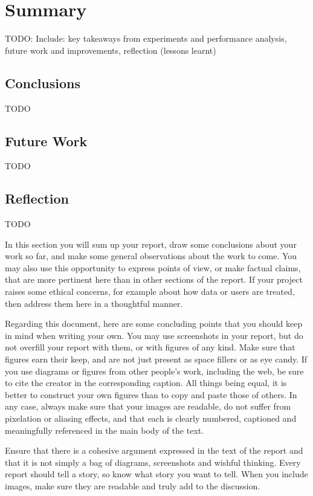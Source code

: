 \chapter{Summary}

TODO: Include: key takeaways from experiments and performance analysis, future work and improvements, reflection (lessons learnt)

\section{Conclusions}

TODO

\section{Future Work}

TODO

\section{Reflection}

TODO

In this section you will sum up your report, draw some conclusions about your work so far, and make some
general observations about the work to come. You may also use this opportunity to express points of view,
or make factual claims, that are more pertinent here than in other sections of the report. If your project
raises some ethical concerns, for example about how data or users are treated, then address them here in a
thoughtful manner.

Regarding this document, here are some concluding points that you should keep in mind when writing your own.
You may use screenshots in your report, but do not overfill your report with them, or with figures of any kind.
Make sure that figures earn their keep, and are not just present as space fillers or as eye candy. If you use
diagrams or figures from other people’s work, including the web, be sure to cite the creator in the corresponding
caption. All things being equal, it is better to construct your own figures than to copy and paste those of others.
In any case, always make sure that your images are readable, do not suffer from pixelation or aliasing effects,
and that each is clearly numbered, captioned and meaningfully referenced in the main body of the text.

Ensure that there is a cohesive argument expressed in the text of the report and that it is not simply a bag of
diagrams, screenshots and wishful thinking. Every report should tell a story, so know what story you want to tell.
When you include images, make sure they are readable and truly add to the discussion.

